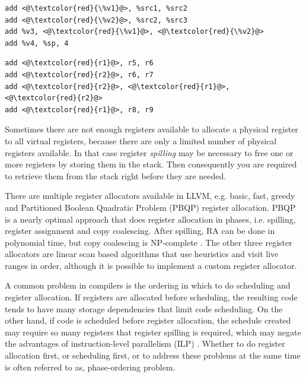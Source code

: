 \begin{center}
\begin{minipage}[t]{.4\textwidth}
\begin{lstlisting}
add <@\textcolor{red}{\%v1}@>, %src1, %src2
add <@\textcolor{red}{\%v2}@>, %src2, %src3
add %v3, <@\textcolor{red}{\%v1}@>, <@\textcolor{red}{\%v2}@>
add %v4, %sp, 4
\end{lstlisting}
\end{minipage}
\begin{minipage}[t]{.4\textwidth}
\begin{lstlisting}
add <@\textcolor{red}{r1}@>, r5, r6
add <@\textcolor{red}{r2}@>, r6, r7
add <@\textcolor{red}{r2}@>, <@\textcolor{red}{r1}@>, <@\textcolor{red}{r2}@>
add <@\textcolor{red}{r1}@>, r8, r9
\end{lstlisting}
\end{minipage}
\label{lst:ra_example}
\end{center}


Sometimes there are not enough registers available to allocate a physical register to all virtual registers, because there are only a limited number of physical registers available. In that case register \emph{spilling} may be necessary to free one or more registers by storing them in the stack. Then consequently you are required to retrieve them from the stack right before they are needed.

There are multiple register allocators available in LLVM, e.g. basic, fast, greedy and Partitioned Boolean Quadratic Problem (PBQP) register allocation. PBQP is a nearly optimal approach that does register allocation in phases, i.e. spilling, register assignment and copy coalescing. After spilling, RA can be done in polynomial time, but copy coalescing is NP-complete \cite{pbqp}. The other three register allocators are linear scan based algorithms that use heuristics and visit live ranges in order, although it is possible to implement a custom register allocator.


A common problem in compilers is the ordering in which to do scheduling and register allocation. If registers are allocated before scheduling, the resulting code tends to have many storage dependencies that limit code scheduling. On the other hand, if code is scheduled before register allocation, the schedule created may require so many registers that register spilling is required, which may negate the advantages of instruction-level parallelism (ILP) \cite[Chapter~10.2.4]{dragon_book}. Whether to do register allocation first, or scheduling first, or to address these problems at the same time is often referred to as, phase-ordering problem. 

